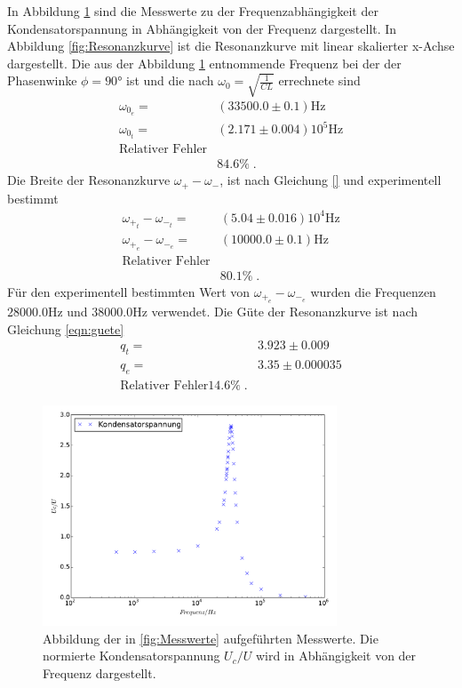 In Abbildung \ref{fig:Kondensatorspannung} sind die
Messwerte zu der Frequenzabhängigkeit der Kondensatorspannung in Abhängigkeit
von der Frequenz dargestellt. In Abbildung \ref{fig:Resonanzkurve} ist die
Resonanzkurve mit linear skalierter x-Achse dargestellt. Die aus der Abbildung
\ref{fig:Kondensatorspannung}
entnommende Frequenz bei der der Phasenwinke $\phi=90°$ ist und die
nach $\omega_0=\sqrt{\frac{1}{CL}}$ errechnete sind
\begin{align*}
\omega_{0_e}=&(33500.0\pm0.1)\si{\hertz}\\
\omega_{0_t}=&(2.171\pm0.004)10^5\si{\hertz}\\
\text{Relativer Fehler}\\
 &84.6\%\;.
\end{align*}
 Die Breite der
Resonanzkurve $\omega_+-\omega_- $, ist nach Gleichung \eqref{}
 und experimentell bestimmt
\begin{align*}
 \omega_{+_t}-\omega_{-_t}=&(5.04\pm0.016)10^4\si{\hertz}\\
 \omega_{+_e}-\omega_{-_e}=&(10000.0\pm0.1)\si{\hertz}\\
 \text{Relativer Fehler}\\
  &80.1\%\;.
\end{align*}
Für den experimentell bestimmten Wert von $\omega_{+_e}-\omega_{-_e}$ wurden
die Frequenzen $28000.0\si{\hertz}$ und $38000.0\si{\hertz}$ verwendet.
Die Güte der Resonanzkurve ist nach Gleichung \eqref{eqn:guete}
\begin{align*}
  q_t=&3.923\pm0.009\\
  q_e=&3.35\pm0.000035\\
  \text{Relativer Fehler}
  14.6\%\;.
\end{align*}
\begin{figure}
  \centering
  \includegraphics[width=0.78\textwidth]{Kondensatorspannung.pdf}
  \caption{Abbildung der in \ref{fig:Messwerte} aufgeführten Messwerte.
  Die normierte Kondensatorspannung $U_c/U$ wird in Abhängigkeit von der
  Frequenz dargestellt.}
  \label{fig:Kondensatorspannung}
\end{figure}
